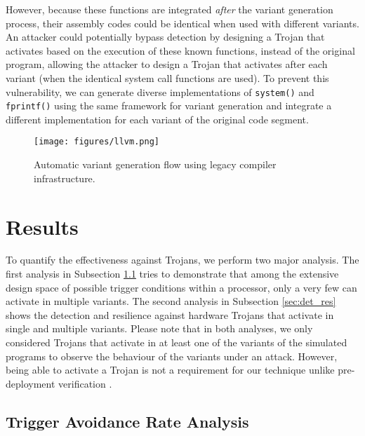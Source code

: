 \documentclass[conference]{IEEEtran}
\begin{document}
However, because these functions are integrated \textit{after} the variant generation process, their assembly codes could be identical when used with different variants. An attacker could potentially bypass detection by designing a Trojan that activates based on the execution of these known functions, instead of the original program, allowing the attacker to design a Trojan that activates after each variant (when the identical system call functions are used). To prevent this vulnerability, we can generate diverse implementations of \texttt{system()} and \texttt{fprintf()} using the same framework for variant generation and integrate a different implementation for each variant of the original code segment. 

\begin{figure}[t!]
\centerline{\texttt{[image: figures/llvm.png]}}
\caption{Automatic variant generation flow using legacy compiler infrastructure. }
\label{fig:llvm}
\end{figure}


\section{Results}
\label{sec:result}
To quantify the effectiveness against Trojans, we perform two major analysis. The first analysis in Subsection \ref{sec:TAR} tries to demonstrate that among the extensive design space of possible trigger conditions within a processor, only a very few can activate in multiple variants. The second analysis in Subsection \ref{sec:det_res} shows the detection and resilience against hardware Trojans that activate in single and multiple variants. Please note that in both analyses, we only considered Trojans that activate in at least one of the variants of the simulated programs to observe the behaviour of the variants under an attack. However, being able to activate a Trojan is not a requirement for our technique unlike pre-deployment verification \cite{chakraborty2009mero}.   

\subsection{Trigger Avoidance Rate Analysis}
\label{sec:TAR}
\end{document}
